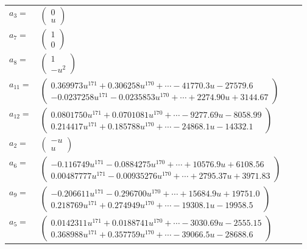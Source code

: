 \documentclass[1p]{elsarticle_modified}
\theoremstyle{definition}
\begin{document}
\begin{tabular}{m{7pt} m{180pt} m{7pt} m{180pt} }
\flushright $a_{3}=$&$\begin{pmatrix}0\\u\end{pmatrix}$ \\
\flushright $a_{7}=$&$\begin{pmatrix}1\\0\end{pmatrix}$ \\
\flushright $a_{8}=$&$\begin{pmatrix}1\\- u^2\end{pmatrix}$ \\
\flushright $a_{11}=$&$\begin{pmatrix}0.369973 u^{171}+0.306258 u^{170}+\cdots-41770.3 u-27579.6\\-0.0237258 u^{171}-0.0235853 u^{170}+\cdots+2274.90 u+3144.67\end{pmatrix}$ \\
\flushright $a_{12}=$&$\begin{pmatrix}0.0801750 u^{171}+0.0701081 u^{170}+\cdots-9277.69 u-8058.99\\0.214417 u^{171}+0.185788 u^{170}+\cdots-24868.1 u-14332.1\end{pmatrix}$ \\
\flushright $a_{2}=$&$\begin{pmatrix}- u\\u\end{pmatrix}$ \\
\flushright $a_{6}=$&$\begin{pmatrix}-0.116749 u^{171}-0.0884275 u^{170}+\cdots+10576.9 u+6108.56\\0.00487777 u^{171}-0.00935276 u^{170}+\cdots+2795.37 u+3971.83\end{pmatrix}$ \\
\flushright $a_{9}=$&$\begin{pmatrix}-0.206611 u^{171}-0.296700 u^{170}+\cdots+15684.9 u+19751.0\\0.218769 u^{171}+0.274949 u^{170}+\cdots-19308.1 u-19958.5\end{pmatrix}$ \\
\flushright $a_{5}=$&$\begin{pmatrix}0.0142311 u^{171}+0.0188741 u^{170}+\cdots-3030.69 u-2555.15\\0.368988 u^{171}+0.357759 u^{170}+\cdots-39066.5 u-28688.6\end{pmatrix}$ \\

\end{tabular}
\end{document}
